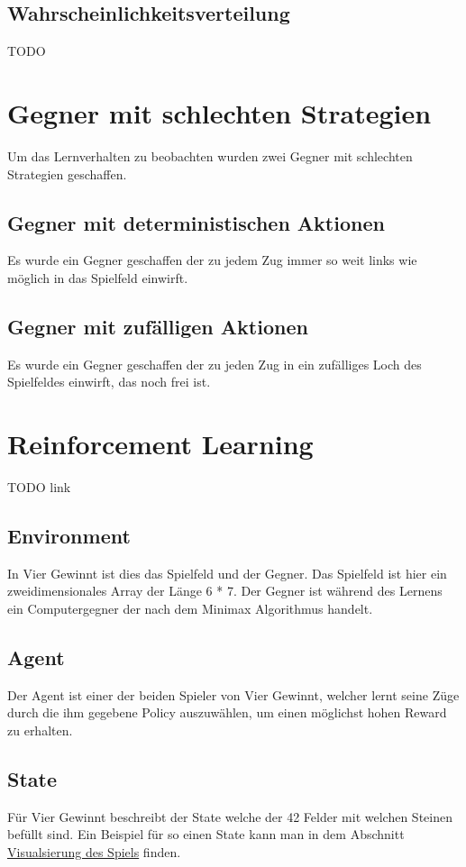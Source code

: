 \subsection{Wahrscheinlichkeitsverteilung}
\colorbox{red!30}{TODO}

\section{Gegner mit schlechten Strategien}
Um das Lernverhalten zu beobachten wurden zwei Gegner mit schlechten Strategien geschaffen.

\subsection{Gegner mit deterministischen Aktionen}
Es wurde ein Gegner geschaffen der zu jedem Zug immer so weit links wie möglich in das Spielfeld einwirft. 

\subsection{Gegner mit zufälligen Aktionen}
Es wurde ein Gegner geschaffen der zu jeden Zug in ein zufälliges Loch des Spielfeldes einwirft, das noch frei ist.


\section{Reinforcement Learning}

\colorbox{red!30}{TODO link}

\subsection{Environment}
In Vier Gewinnt ist dies das Spielfeld und der Gegner. Das Spielfeld ist hier ein zweidimensionales Array der Länge 6 * 7. Der Gegner ist während des Lernens ein Computergegner der nach dem Minimax Algorithmus handelt. \\

\subsection{Agent}
Der Agent ist einer der beiden Spieler von Vier Gewinnt, welcher lernt seine Züge durch die ihm gegebene Policy auszuwählen, um einen möglichst hohen Reward zu erhalten.\\


\subsection{State}
 Für Vier Gewinnt beschreibt der State welche der 42 Felder mit welchen Steinen befüllt sind. Ein Beispiel für so einen State kann man in dem Abschnitt \hyperref[sec:visualisierung]{Visualsierung des Spiels} finden.\\


